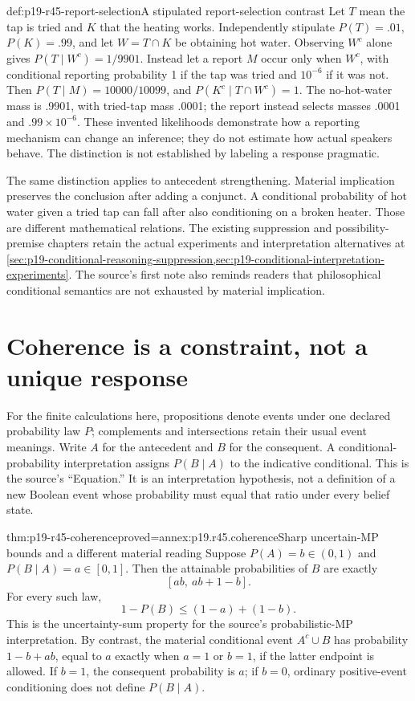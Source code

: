 \begin{hbexample}{def:p19-r45-report-selection}{A stipulated report-selection contrast}
Let \(T\) mean the tap is tried and \(K\) that the heating works.
Independently stipulate \(P(T)=.01\), \(P(K)=.99\), and let
\(W=T\cap K\) be obtaining hot water. Observing \(W^c\) alone gives
\(P(T\mid W^c)=1/9901\). Instead let a report \(M\) occur only
when \(W^c\), with conditional reporting probability 1 if the tap
was tried and \(10^{-6}\) if it was not. Then
\(P(T\mid M)=10000/10099\), and \(P(K^c\mid T\cap W^c)=1\).
The no-hot-water mass is .9901, with tried-tap mass .0001;
the report instead selects masses .0001 and \(.99\times10^{-6}\).
These invented likelihoods demonstrate how a reporting mechanism can
change an inference; they do not estimate how actual speakers behave.
The distinction is not established by labeling a response pragmatic.
\end{hbexample}

The same distinction applies to antecedent strengthening. Material
implication preserves the conclusion after adding a conjunct. A
conditional probability of hot water given a tried tap can fall after
also conditioning on a broken heater. Those are different mathematical
relations. The existing suppression and possibility-premise chapters
retain the actual experiments and interpretation alternatives at
\cref{sec:p19-conditional-reasoning-suppression,sec:p19-conditional-interpretation-experiments}.
The source's first note also reminds readers that philosophical
conditional semantics are not exhausted by material implication.

\section{Coherence is a constraint, not a unique response}
\label{sec:p19-r45-coherence}

For the finite calculations here, propositions denote events under one
declared probability law \(P\); complements and intersections retain
their usual event meanings. Write \(A\) for the antecedent and
\(B\) for the consequent. A conditional-probability interpretation
assigns \(P(B\mid A)\) to the indicative conditional. This is the
source's ``Equation.'' It is an interpretation hypothesis, not a
definition of a new Boolean event whose probability must equal that
ratio under every belief state.

\begin{hbtheorem}{thm:p19-r45-coherence}{proved=annex:p19.r45.coherence}{Sharp uncertain-MP bounds and a different material reading}
Suppose \(P(A)=b\in(0,1)\) and \(P(B\mid A)=a\in[0,1]\).
Then the attainable probabilities of \(B\) are exactly
\[
 [ab,\ ab+1-b].
\]
For every such law,
\[
 1-P(B)\leq (1-a)+(1-b).
\]
This is the uncertainty-sum property for the source's probabilistic-MP
interpretation. By contrast, the material conditional event
\(A^c\cup B\) has probability \(1-b+ab\), equal to \(a\)
exactly when \(a=1\) or \(b=1\), if the latter endpoint is allowed.
If \(b=1\), the consequent probability is \(a\); if \(b=0\),
ordinary positive-event conditioning does not define \(P(B\mid A)\).
\end{hbtheorem}

